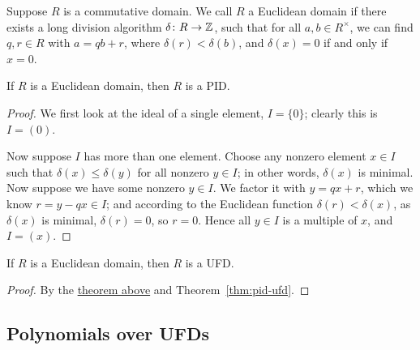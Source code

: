 \begin{definition}
    Suppose \(R\) is a commutative domain.
    We call \(R\) a Euclidean domain if there exists a long division algorithm
    \(\delta\colon R\to\mathbb{Z}\),
    such that for all \(a,b \in R^\times\),
    we can find \(q,r \in R\) with \(a = qb + r\),
    where \(\delta(r) < \delta(b)\),
    and \(\delta(x) = 0\) if and only if \(x = 0\).
\end{definition}
\begin{theorem}\label{thm:euclidean-pid}
    If \(R\) is a Euclidean domain,
    then \(R\) is a PID.\@
\end{theorem}
\begin{proof}
    We first look at the ideal of a single element, \(I = \{0\}\);
    clearly this is \(I = (0)\).

    Now suppose \(I\) has more than one element.
    Choose any nonzero element \(x \in I\)
    such that \(\delta(x) \leq \delta(y)\) for all nonzero \(y \in I\);
    in other words, \(\delta(x)\) is minimal.
    Now suppose we have some nonzero \(y \in I\).
    We factor it with \(y = qx + r\),
    which we know \(r = y - qx \in I\);
    and according to the Euclidean function \(\delta(r) < \delta(x)\),
    as \(\delta(x)\) is minimal, \(\delta(r) = 0\), so \(r = 0\).
    Hence all \(y \in I\) is a multiple of \(x\),
    and \(I = (x)\).
\end{proof}
\begin{corollary}\label{cor:euclidean-ufd}
    If \(R\) is a Euclidean domain,
    then \(R\) is a UFD.\@
\end{corollary}
\begin{proof}
    By the \hyperref[thm:euclidean-pid]{theorem above}
    and Theorem~\ref{thm:pid-ufd}.
\end{proof}

\subsection*{Polynomials over UFDs}

